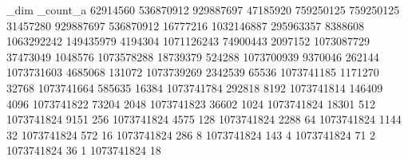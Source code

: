 \let\trigxtmp\tmp_dim
\let\trigiter\tmp_count_a
\def\triglimit{28}%
\def\trigvalarg#1{\csname argscaled:\number#1\endcsname}
\def\trigvalcos#1{\csname cosscaled:\number#1\endcsname}
\def\trigvalsin#1{\csname sinscaled:\number#1\endcsname}
\def\defspectrig#1#2#3#4{%
  \expandafter\def\csname argscaled:#1\endcsname{#2}%
  \expandafter\def\csname cosscaled:#1\endcsname{#3}%
  \expandafter\def\csname sinscaled:#1\endcsname{#4}%
}
\defspectrig{1}{62914560}{536870912}{929887697}  %
\defspectrig{2}{47185920}{759250125}{759250125}  %
\defspectrig{3}{31457280}{929887697}{536870912}  %
\defspectrig{4}{16777216}{1032146887}{295963357} %
\defspectrig{5}{8388608}{1063292242}{149435979}  %
\defspectrig{6}{4194304}{1071126243}{74900443}   %
\defspectrig{7}{2097152}{1073087729}{37473049}   %
\defspectrig{8}{1048576}{1073578288}{18739379}   %
\defspectrig{9}{524288}{1073700939}{9370046}     %
\defspectrig{10}{262144}{1073731603}{4685068}    %
\defspectrig{11}{131072}{1073739269}{2342539}    %
\defspectrig{12}{65536}{1073741185}{1171270}     %
\defspectrig{13}{32768}{1073741664}{585635}      %
\defspectrig{14}{16384}{1073741784}{292818}      %
\defspectrig{15}{8192}{1073741814}{146409}       %
\defspectrig{16}{4096}{1073741822}{73204}        %
\defspectrig{17}{2048}{1073741823}{36602}        %
\defspectrig{18}{1024}{1073741824}{18301}        %
\defspectrig{19}{512}{1073741824}{9151}          %
\defspectrig{20}{256}{1073741824}{4575}          %
\defspectrig{21}{128}{1073741824}{2288}          %
\defspectrig{22}{64}{1073741824}{1144}           %
\defspectrig{23}{32}{1073741824}{572}            %
\defspectrig{24}{16}{1073741824}{286}            %
\defspectrig{25}{8}{1073741824}{143}             %
\defspectrig{26}{4}{1073741824}{71}              %
\defspectrig{27}{2}{1073741824}{36}              %
\defspectrig{28}{1}{1073741824}{18}              %
